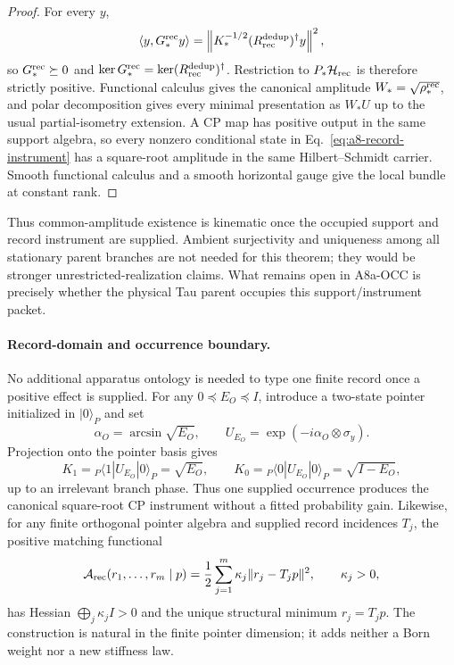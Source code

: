 \documentclass[11pt]{article}
\begin{document}
\begin{proof}
For every \(y\),
\[
 \langle y,G_*^{\rm rec}y\rangle
 =\left\|K_*^{-1/2}(R_{\rm rec}^{\rm dedup})^\dagger y\right\|^2,
\]
so \(G_*^{\rm rec}\succeq0\) and
\(\ker G_*^{\rm rec}=\ker(R_{\rm rec}^{\rm dedup})^\dagger\).  Restriction
to \(P_*\mathcal H_{\rm rec}\) is therefore strictly positive.  Functional
calculus gives the canonical amplitude \(W_*=\sqrt{\rho_*^{\rm rec}}\), and
polar decomposition gives every minimal presentation as \(W_*U\) up to the
usual partial-isometry extension.  A CP map has positive output in the same
support algebra, so every nonzero conditional state in
Eq.~\eqref{eq:a8-record-instrument} has a square-root amplitude in the same
Hilbert--Schmidt carrier.  Smooth functional calculus and a smooth horizontal
gauge give the local bundle at constant rank.
\end{proof}

Thus common-amplitude existence is kinematic once the occupied support and
record instrument are supplied.  Ambient surjectivity and uniqueness among
all stationary parent branches are not needed for this theorem; they would be
stronger unrestricted-realization claims.  What remains open in A8a-OCC is precisely
whether the physical Tau parent occupies this support/instrument packet.

\paragraph{Record-domain and occurrence boundary.}
No additional apparatus ontology is needed to type one finite record once a
positive effect is supplied.  For any \(0\preceq E_O\preceq I\), introduce a
two-state pointer initialized in \(\lvert0\rangle_P\) and set
\begin{equation}
 \alpha_O=\arcsin\sqrt{E_O},
 \qquad
 U_{E_O}=\exp(-i\alpha_O\otimes\sigma_y).
 \label{eq:minimal-naimark-pointer}
\end{equation}
Projection onto the pointer basis gives
\begin{equation}
 K_1={}_P\!\langle1|U_{E_O}|0\rangle_P=\sqrt{E_O},
 \qquad
 K_0={}_P\!\langle0|U_{E_O}|0\rangle_P=\sqrt{I-E_O},
 \label{eq:minimal-square-root-instrument}
\end{equation}
up to an irrelevant branch phase.  Thus one supplied occurrence produces the
canonical square-root CP instrument without a fitted probability gain.
Likewise, for any finite orthogonal pointer algebra and supplied record
incidences \(T_j\), the positive matching functional
\begin{equation}
 \mathcal A_{\rm rec}(r_1,\ldots,r_m\mid p)
 =\frac{1}{2}\sum_{j=1}^m\kappa_j\lVert r_j-T_jp\rVert^2,
 \qquad \kappa_j>0,
 \label{eq:positive-record-matching}
\end{equation}
has Hessian \(\bigoplus_j\kappa_j I>0\) and the unique structural minimum
\(r_j=T_jp\).  The construction is natural in the finite pointer dimension;
it adds neither a Born weight nor a new stiffness law.
\end{document}
